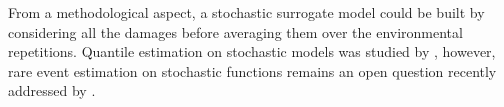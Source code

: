 From a methodological aspect, a stochastic surrogate model could be built by considering all the damages before averaging them over the environmental repetitions. 
Quantile estimation on stochastic models was studied by \cite{browne_2016_stochastic_quantile}, however, rare event estimation on stochastic functions remains an open question recently addressed by \citet{pires_2023_noisy_RA}. 
